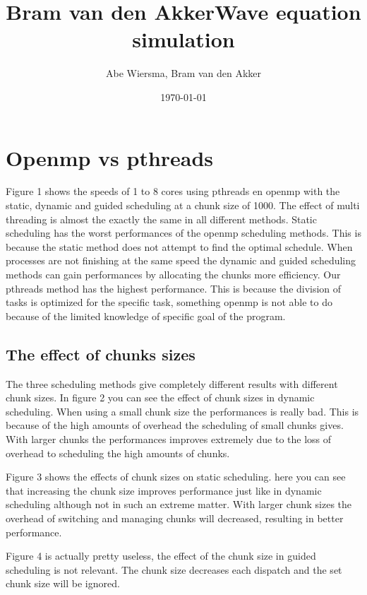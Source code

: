 \documentclass[10pt]{article}
\title{\bfseries\Huge Bram van den Akker}
\date{}
\begin{document}
\title{Wave equation simulation}
\author{Abe Wiersma, Bram van den Akker}
\date{\today}
\maketitle
\newpage

\section{Openmp vs pthreads}
Figure 1 shows the speeds of 1 to 8 cores using pthreads en openmp with the static, dynamic and guided scheduling at a chunk size of 1000. The effect of multi threading is almost the exactly the same in all different methods. 
Static scheduling has the worst performances of the openmp scheduling methods. This is because the static method does not attempt to find the optimal schedule. When processes are not finishing at the same speed the dynamic and guided scheduling methods can gain performances by allocating the chunks more efficiency.
Our pthreads method has the highest performance. This is because the division of tasks is optimized for the specific task, something openmp is not able to do because of the limited knowledge of specific goal of the program.

\subsection{The effect of chunks sizes}
The three scheduling methods give completely different results with different chunk sizes. 
In figure 2 you can see the effect of chunk sizes in dynamic scheduling. When using a small chunk size the performances is really bad. This is because of the high amounts of overhead the scheduling of small chunks gives. With larger chunks the performances improves extremely due to the loss of overhead to scheduling the high amounts of chunks.

Figure 3 shows the effects of chunk sizes on static scheduling. here you can see that increasing the chunk size improves performance just like in dynamic scheduling although not in such an extreme matter. With larger chunk sizes the overhead of switching and managing chunks will decreased, resulting in better performance.
 
Figure 4 is actually pretty useless, the effect of the chunk size in guided scheduling is not relevant. The chunk size decreases each dispatch and the set chunk size will be ignored. 
\end{document}
